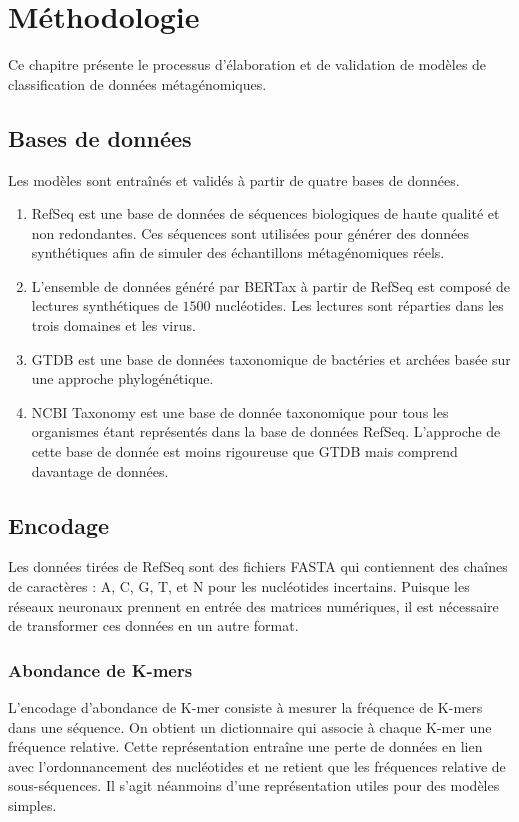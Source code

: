 \chapter{Méthodologie}
\label{chapitre:2}
Ce chapitre présente le processus d'élaboration et de validation de modèles de classification de
données métagénomiques.

\section{Bases de données}
\label{chapitre:2:bases_de_donnes}
Les modèles sont entraînés et validés à partir de quatre bases de données.

\begin{enumerate}
    \item RefSeq \cite{refseq} est une base de données de séquences biologiques de haute qualité
        et non redondantes. Ces séquences sont utilisées pour générer des données synthétiques afin
        de simuler des échantillons métagénomiques réels.
    \item L'ensemble de données généré par BERTax à partir de RefSeq \cite{mock2022} est composé
        de lectures synthétiques de $1500$ nucléotides. Les lectures sont réparties dans les trois
        domaines et les virus.
    \item GTDB \cite{gtdb} est une base de données taxonomique de bactéries et archées basée sur
        une approche phylogénétique.
    \item NCBI Taxonomy \cite{ncbi_tax} est une base de donnée taxonomique pour tous les organismes
        étant représentés dans la base de données RefSeq. L'approche de cette base de donnée est
        moins rigoureuse que GTDB mais comprend davantage de données.
\end{enumerate}

\section{Encodage}
Les données tirées de RefSeq sont des fichiers FASTA qui contiennent des chaînes de caractères :
A, C, G, T, et N pour les nucléotides incertains. Puisque les réseaux neuronaux prennent en entrée
des matrices numériques, il est nécessaire de transformer ces données en un autre format.

\subsection{Abondance de K-mers}
L'encodage d'abondance de K-mer consiste à mesurer la fréquence de K-mers dans une séquence. On
obtient un dictionnaire qui associe à chaque K-mer une fréquence relative. Cette représentation
entraîne une perte de données en lien avec l'ordonnancement des nucléotides et ne retient que les
fréquences relative de sous-séquences. Il s'agit néanmoins d'une représentation utiles pour des
modèles simples.

